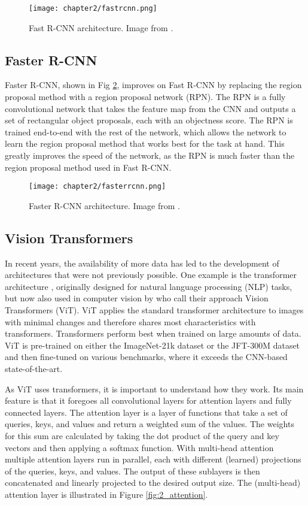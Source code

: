 \begin{figure}[H]
	\centering
	\texttt{[image: chapter2/fastrcnn.png]}
	\caption{\label{fig:2_fastrcnn} Fast R-CNN architecture. Image from \citet{fastrcnn}.}
\end{figure}

\subsection{Faster R-CNN \cite{fasterrcnn}}
Faster R-CNN, shown in Fig \ref{fig:2_fasterrcnn}, improves on Fast R-CNN by replacing the region proposal method with a region proposal network (RPN). The RPN is a fully convolutional network that takes the feature map from the CNN and outputs a set of rectangular object proposals, each with an objectness score. The RPN is trained end-to-end with the rest of the network, which allows the network to learn the region proposal method that works best for the task at hand. This greatly improves the speed of the network, as the RPN is much faster than the region proposal method used in Fast R-CNN.

\begin{figure}[H]
	\centering
	\texttt{[image: chapter2/fasterrcnn.png]}
	\caption{\label{fig:2_fasterrcnn} Faster R-CNN architecture. Image from \citet{fasterrcnn}.}
\end{figure}

\subsection{Vision Transformers \cite{vit}}
In recent years, the availability of more data has led to the development of architectures that were not previously possible. One example is the transformer architecture \cite{transformers}, originally designed for natural language processing (NLP) tasks, but now also used in computer vision by \citet{vit} who call their approach Vision Transformers (ViT). ViT applies the standard transformer architecture to images with minimal changes and therefore shares most characteristics with transformers. Transformers perform best when trained on large amounts of data. ViT is pre-trained on either the ImageNet-21k dataset or the JFT-300M dataset and then fine-tuned on various benchmarks, where it exceeds the CNN-based state-of-the-art. 

As ViT uses transformers, it is important to understand how they work. Its main feature is that it foregoes all convolutional layers for attention layers and fully connected layers. The attention layer is a layer of functions that take a set of queries, keys, and values and return a weighted sum of the values. The weights for this sum are calculated by taking the dot product of the query and key vectors and then applying a softmax function. With multi-head attention multiple attention layers run in parallel, each with different (learned) projections of the queries, keys, and values. The output of these sublayers is then concatenated and linearly projected to the desired output size. The (multi-head) attention layer is illustrated in Figure \ref{fig:2_attention}.

